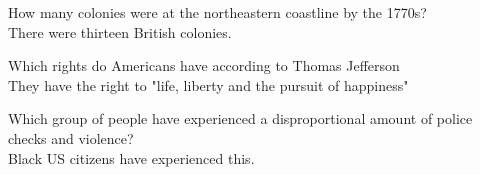 \documentclass[a4paper]{report}
\begin{document}
	\newcommand{\bsq}[2]{
		\centering
		{
			\Huge {#1}
		}
		\\
		\vspace{1.2cm}
		{
			\Large {#2}
		}
		\thispagestyle{empty}
		\newpage
	}
	\bsq{How many colonies were at the northeastern coastline by the 1770s?}{There were thirteen British colonies.}
	
	\bsq{Which rights do Americans have according to Thomas Jefferson}{They have the right to "life, liberty and the pursuit of happiness"}

	\bsq{Which group of people have experienced a disproportional amount of police checks and violence?}{Black US citizens have experienced this.}
\end{document}
